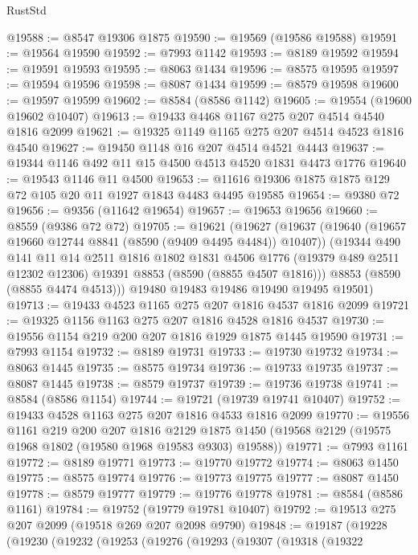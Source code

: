 \begin{lexlean}{RustStd}
\begin{coremodule}
@19588 := @8547 @19306 @1875
@19590 := @19569 (@19586 @19588)
@19591 := @19564 @19590
@19592 := @7993 @1142
@19593 := @8189 @19592
@19594 := @19591 @19593
@19595 := @8063 @1434
@19596 := @8575 @19595
@19597 := @19594 @19596
@19598 := @8087 @1434
@19599 := @8579 @19598
@19600 := @19597 @19599
@19602 := @8584 (@8586 @1142)
@19605 := @19554 (@19600 @19602 @10407)
@19613 := @19433 @4468 @1167 @275 @207 @4514 @4540 @1816 @2099
@19621 := @19325 @1149 @1165 @275 @207 @4514 @4523 @1816 @4540
@19627 := @19450 @1148 @16 @207 @4514 @4521 @4443
@19637 := @19344 @1146 @492 @11 @15 @4500 @4513 @4520 @1831 @4473 @1776
@19640 := @19543 @1146 @11 @4500
@19653 := @11616 @19306 @1875 @1875 @129 @72 @105 @20 @11 @1927 @1843 @4483 @4495 @19585
@19654 := @9380 @72
@19656 := @9356 (@11642 @19654)
@19657 := @19653 @19656
@19660 := @8559 (@9386 @72 @72)
@19705 := @19621
    (@19627
      (@19637
        (@19640 (@19657 @19660 @12744 @8841 (@8590 (@9409 @4495 @4484)) @10407))
        (@19344
          @490
          @141
          @11
          @14
          @2511
          @1816
          @1802
          @1831
          @4506
          @1776
          (@19379 @489 @2511 @12302 @12306)
          @19391
          @8853
          (@8590 (@8855 @4507 @1816)))
        @8853
        (@8590 (@8855 @4474 @4513)))
      @19480
      @19483
      @19486
      @19490
      @19495
      @19501)
@19713 := @19433 @4523 @1165 @275 @207 @1816 @4537 @1816 @2099
@19721 := @19325 @1156 @1163 @275 @207 @1816 @4528 @1816 @4537
@19730 := @19556 @1154 @219 @200 @207 @1816 @1929 @1875 @1445 @19590
@19731 := @7993 @1154
@19732 := @8189 @19731
@19733 := @19730 @19732
@19734 := @8063 @1445
@19735 := @8575 @19734
@19736 := @19733 @19735
@19737 := @8087 @1445
@19738 := @8579 @19737
@19739 := @19736 @19738
@19741 := @8584 (@8586 @1154)
@19744 := @19721 (@19739 @19741 @10407)
@19752 := @19433 @4528 @1163 @275 @207 @1816 @4533 @1816 @2099
@19770 := @19556
    @1161
    @219
    @200
    @207
    @1816
    @2129
    @1875
    @1450
    (@19568 @2129 (@19575 @1968 @1802 (@19580 @1968 @19583 @9303) @19588))
@19771 := @7993 @1161
@19772 := @8189 @19771
@19773 := @19770 @19772
@19774 := @8063 @1450
@19775 := @8575 @19774
@19776 := @19773 @19775
@19777 := @8087 @1450
@19778 := @8579 @19777
@19779 := @19776 @19778
@19781 := @8584 (@8586 @1161)
@19784 := @19752 (@19779 @19781 @10407)
@19792 := @19513 @275 @207 @2099 (@19518 @269 @207 @2098 @9790)
@19848 := @19187
    (@19228
      (@19230
        (@19232
          (@19253
            (@19276
              (@19293
                (@19307
                  (@19318
                    (@19322

\end{coremodule}
\end{lexlean}
